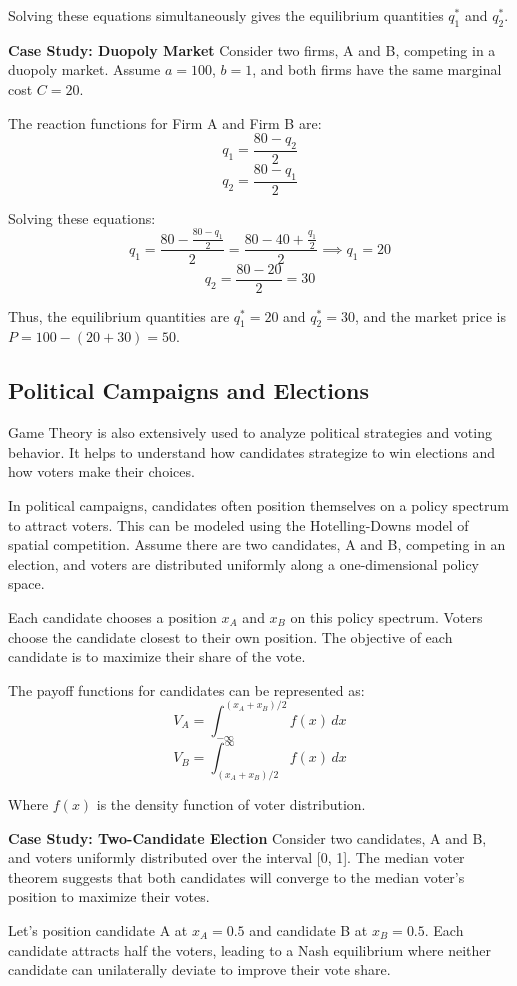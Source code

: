 \documentclass[12pt]{book} %
\begin{document}
Solving these equations simultaneously gives the equilibrium quantities \( q_1^* \) and \( q_2^* \).

\textbf{Case Study: Duopoly Market}
Consider two firms, A and B, competing in a duopoly market. Assume \( a = 100 \), \( b = 1 \), and both firms have the same marginal cost \( C = 20 \).

The reaction functions for Firm A and Firm B are:
\[
q_1 = \frac{80 - q_2}{2}
\]
\[
q_2 = \frac{80 - q_1}{2}
\]

Solving these equations:
\[
q_1 = \frac{80 - \frac{80 - q_1}{2}}{2} = \frac{80 - 40 + \frac{q_1}{2}}{2} \implies q_1 = 20
\]
\[
q_2 = \frac{80 - 20}{2} = 30
\]

Thus, the equilibrium quantities are \( q_1^* = 20 \) and \( q_2^* = 30 \), and the market price is \( P = 100 - (20 + 30) = 50 \).

\subsection{Political Campaigns and Elections}
Game Theory is also extensively used to analyze political strategies and voting behavior. It helps to understand how candidates strategize to win elections and how voters make their choices.

In political campaigns, candidates often position themselves on a policy spectrum to attract voters. This can be modeled using the Hotelling-Downs model of spatial competition. Assume there are two candidates, A and B, competing in an election, and voters are distributed uniformly along a one-dimensional policy space.

Each candidate chooses a position \( x_A \) and \( x_B \) on this policy spectrum. Voters choose the candidate closest to their own position. The objective of each candidate is to maximize their share of the vote.

The payoff functions for candidates can be represented as:
\[
V_A = \int_{-\infty}^{(x_A + x_B)/2} f(x) \, dx
\]
\[
V_B = \int_{(x_A + x_B)/2}^{\infty} f(x) \, dx
\]

Where \( f(x) \) is the density function of voter distribution.

\textbf{Case Study: Two-Candidate Election}
Consider two candidates, A and B, and voters uniformly distributed over the interval [0, 1]. The median voter theorem suggests that both candidates will converge to the median voter's position to maximize their votes.

Let's position candidate A at \( x_A = 0.5 \) and candidate B at \( x_B = 0.5 \). Each candidate attracts half the voters, leading to a Nash equilibrium where neither candidate can unilaterally deviate to improve their vote share.
\end{document}
